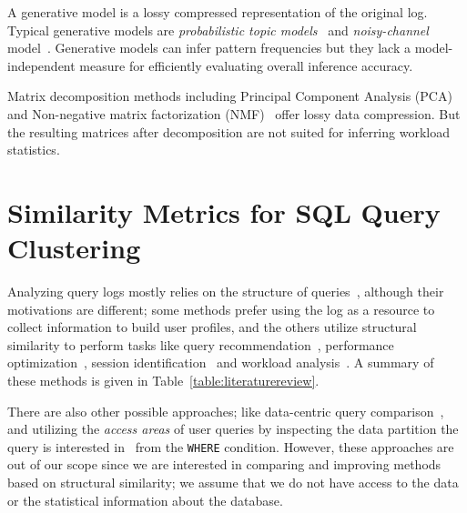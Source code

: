 A generative model is a lossy compressed representation of the original log.
Typical generative models are \textit{probabilistic topic models}~\cite{DBLP:journals/cacm/Blei12,DBLP:conf/acl/WangZLG09} and \textit{noisy-channel} model~\cite{DBLP:journals/ai/KnightM02}.
Generative models can infer pattern frequencies but they lack a model-independent measure for efficiently evaluating overall inference accuracy.

Matrix decomposition methods including Principal Component Analysis (PCA)~\cite{DBLP:reference/stat/Jolliffe11} and Non-negative matrix factorization (NMF)~\cite{lee1999learning} offer lossy data compression.
But the resulting matrices after decomposition are not suited for inferring workload statistics.

\section{Similarity Metrics for SQL Query Clustering}
\label{sec:tkdebackground}
Analyzing query logs mostly relies on the structure of queries~\cite{Kamra2007SyntaxBased}, although their motivations are different; some methods prefer using the log as a resource to collect information to build user profiles, and the others utilize structural similarity to perform tasks like query recommendation~\cite{giacometti2009, yang2009, chatzopoulou2011querie}, performance optimization~\cite{aouiche2006},  session identification~\cite{aligon2014similarity} and workload analysis~\cite{makiyama2015text}.  A summary of these methods is given in Table~\ref{table:literaturereview}.

There are also other possible approaches; like data-centric query comparison~\cite{Mathew2010Raid}, and utilizing the \textit{access areas} of user queries by inspecting the data partition the query is interested in~\cite{nguyen2015identifying} from the \texttt{WHERE} condition.
However, these approaches are out of our scope
since we are interested in comparing and improving methods based on structural similarity; we assume that
we do not have access to the data or the statistical information about the database. 

